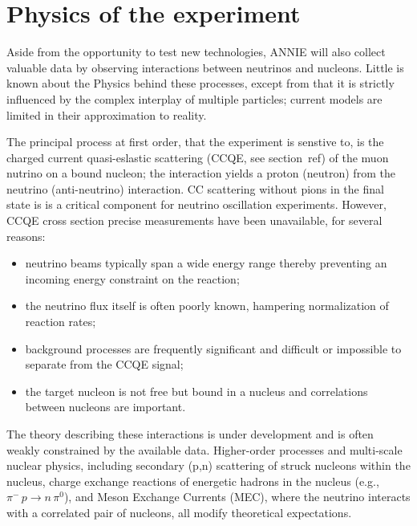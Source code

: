  \section{Physics of the experiment}

 Aside from the opportunity to test new technologies, ANNIE will also collect valuable data by observing %
 interactions between neutrinos and nucleons.
 Little is known about the Physics behind these processes, except from that it is strictly influenced by the %
 complex interplay of multiple particles; current models are limited in their approximation to reality.

 The principal process at first order, that the experiment is senstive to, is the charged current quasi-eslastic %
 scattering (CCQE, see section~ref) of the muon nutrino on a bound nucleon; the interaction yields a proton %
 (neutron) from the neutrino (anti-neutrino) interaction.
 CC scattering without pions in the final state is is a critical component for neutrino oscillation experiments.
 However, CCQE cross section precise measurements have been unavailable, for several reasons:
 \begin{itemize}
   \item neutrino beams typically span a wide energy range thereby preventing an incoming energy constraint on the %
     reaction;
   \item the neutrino flux itself is often poorly known, hampering normalization of reaction rates;
   \item background processes are frequently significant and difficult or impossible to separate from %
     the CCQE signal;
   \item the target nucleon is not free but bound in a nucleus and correlations between nucleons are important.
 \end{itemize}
 
 The theory describing these interactions is under development and is often weakly constrained %
 by the available data.
 Higher-order processes and multi-scale nuclear physics, including secondary (p,n) scattering %
 of struck nucleons within the nucleus, charge exchange reactions of energetic hadrons %
 in the nucleus (e.g., $\pi^- \, p\rightarrow n \, \pi^0$), and Meson Exchange Currents (MEC), where %
 the neutrino interacts with a correlated pair of nucleons, all modify theoretical expectations.

